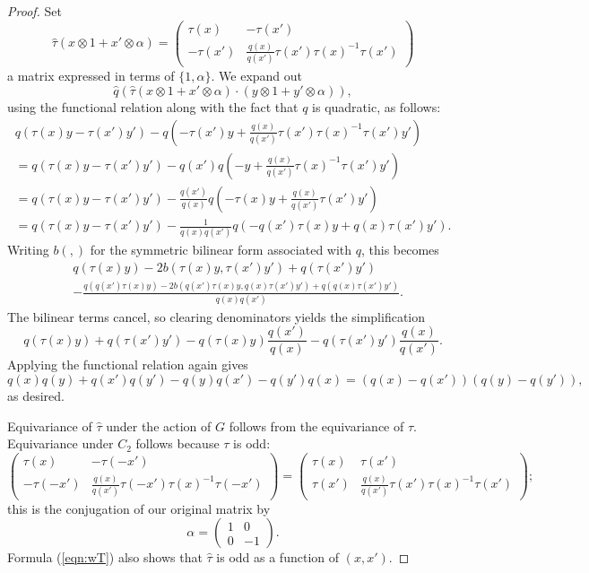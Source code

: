 \documentclass[12pt]{amsart}
\numberwithin{equation}{section}
\newcommand{\wQ}{\widehat{q}}
\newcommand{\wT}{\widehat{\tau}}
\theoremstyle{plain}
\theoremstyle{definition}
\theoremstyle{remark}
\begin{document}
\begin{proof}
Set 
\begin{equation}
\wT(x \otimes 1 + x' \otimes \alpha)
= \left(
\begin{matrix} \tau(x) & -\tau(x') \\
        -\tau(x') & \frac{q(x)}{q(x')}\tau(x')\tau(x)^{-1}\tau(x')
        \end{matrix} \right)
\label{eqn:wT}
\end{equation}
a matrix expressed in terms of $\{1,\alpha \}.$
We expand out 
$$\wQ\left(\wT(x\otimes 1 + x'\otimes \alpha)\cdot
(y\otimes 1 + y'\otimes \alpha)\right),$$
using the functional relation along with the fact
that $q$ is quadratic, as follows:
\begin{align*}
q(\tau(x)y - \tau(x')y') - 
q(-\tau(x')y+\frac{q(x)}{q(x')}\tau(x')\tau(x)^{-1}\tau(x')y')  \\
= 
q(\tau(x)y - \tau(x')y') - 
q(x') q(-y+\frac{q(x)}{q(x')}\tau(x)^{-1}\tau(x')y')\\
=
q(\tau(x)y - \tau(x')y') - 
\frac{q(x')}{q(x)} q(-\tau(x)y+\frac{q(x)}{q(x')}\tau(x')y') \\
= q(\tau(x)y - \tau(x')y') - \frac{1}{q(x)q(x')}
q(-q(x')\tau(x)y+q(x)\tau(x')y').
\end{align*}
Writing $b(,)$ for the symmetric bilinear form 
associated with $q$, this becomes
\begin{align*}
&q(\tau(x)y) - 2b(\tau(x)y,\tau(x')y')+q(\tau(x')y') \\
&-\frac{q(q(x')\tau(x)y)-2b(q(x')\tau(x)y,q(x)\tau(x')y') + q(q(x)\tau(x')y')}{q(x)q(x')}.
\end{align*}
The bilinear terms cancel, so clearing denominators
yields the simplification
$$q(\tau(x)y) + q(\tau(x')y') - q(\tau(x)y)\frac{q(x')}{q(x)}
- q(\tau(x')y') \frac{q(x)}{q(x')}.$$
Applying the functional relation again gives
$$q(x)q(y) + q(x')q(y') - q(y)q(x') - q(y')q(x)
=(q(x)-q(x'))(q(y)-q(y')),$$
as desired.

Equivariance of $\wT$ under the action of $G$ follows from the equivariance of $\tau$. Equivariance under
$C_2$ follows because $\tau$ is odd:
$$\left(
\begin{matrix} \tau(x) & -\tau(-x') \\
        -\tau(-x') & \frac{q(x)}{q(x')}\tau(-x')\tau(x)^{-1}\tau(-x')
        \end{matrix} \right)
        =
        \left(
\begin{matrix} \tau(x) & \tau(x') \\
        \tau(x') & \frac{q(x)}{q(x')}\tau(x')\tau(x)^{-1}\tau(x')
        \end{matrix} \right); 
$$
this is the conjugation of our original matrix by
$$\alpha = \left( \begin{matrix} 1 & 0 \\ 0 & -1 \end{matrix}
\right).$$
Formula (\ref{eqn:wT}) also shows that $\wT$ is odd 
as a function of $(x,x')$.
\end{proof}
\end{document}
